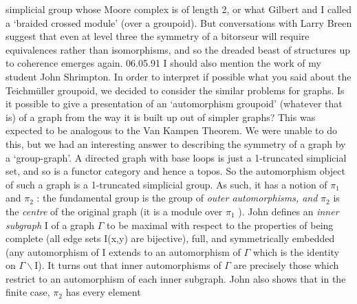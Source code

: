 simplicial group whose Moore complex is of length 2, or what Gilbert and I
called a `braided crossed module' (over a groupoid).  But conversations with
Larry Breen suggest that even at level three the symmetry of a bitorseur
will require equivalences rather than isomorphisms, and so the dreaded beast
of structures up to coherence emerges again.
06.05.91
I should also mention the work of my student John Shrimpton.  In order
to interpret if possible what you said about the Teichm\"uller groupoid, we
decided to consider the similar problems for graphs.  Is it possible to give
a presentation of an `automorphism groupoid' (whatever that is) of a graph
from the way it is built up out of simpler graphs?  This was expected to be
analogous to the Van Kampen Theorem.
We were unable to do this, but we had an interesting answer to
describing the symmetry of a graph by a `group-graph'.  A directed graph
with base loops is just a 1-truncated simplicial set, and so is a functor
category and hence a topos.  So the automorphism object of such a graph is a
1-truncated simplicial group.  As such, it has a notion of $\pi_1$ and $\pi_2$ : the
fundamental group is the group of \textit{outer automorphisms, and} $\pi_2$ is the
\textit{centre} of the original graph (it is a module over $\pi_1$ ).  John defines an
\textit{inner subgraph} I of a graph $\Gamma$ to be maximal with respect to the properties
of being complete (all edge sets I(x,y) are bijective), full, and
symmetrically embedded (any automorphism of I extends to an automorphism of
$\Gamma$ which is the identity on $\Gamma\backslash$I).  It turns out that inner automorphisms of
$\Gamma$ are precisely those which restrict to an automorphism of each inner
subgraph.  John also shows that in the finite case, $\pi_2$ has every element


